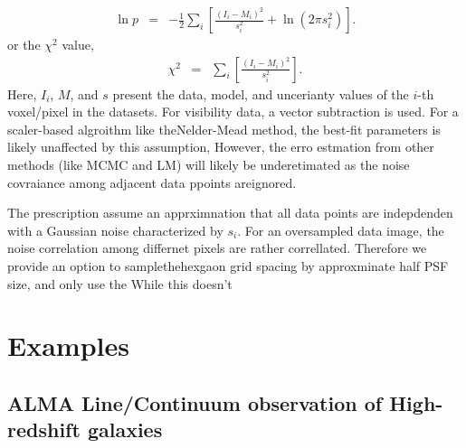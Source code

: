 \documentclass[twocolumn,tighten]{aastex62}
\begin{document}
\begin{eqnarray}
\label{eq:likelihood}
\ln p & = & -\frac{1}{2}\sum\limits_{i}\left[ \frac{(I_i-M_i)^2}{s_i^2} + \ln(2\pi s_i^2)   \right].
\end{eqnarray}
or the $\chi^2$ value,
\begin{eqnarray}
\label{eq:chisq}
\chi^2 & = & \sum\limits_{i}\left[ \frac{(I_i-M_i)^2}{s_i^2} \right].
\end{eqnarray}
Here, $I_i$, $M$, and $s$ present the data, model, and uncerianty values of the $i$-th voxel/pixel in the datasets.
For visibility data, a vector subtraction is used.
For a scaler-based algroithm like theNelder-Mead method, the best-fit parameters is likely unaffected by this assumption, 
However, the erro estmation from other methods (like MCMC and LM) will likely be underetimated as the noise covraiance among adjacent data ppoints areignored.

The prescription assume an apprximnation that all data points are indepdenden with a Gaussian noise characterized by $s_i$.
For an oversampled data image, the noise correlation among differnet pixels are rather correllated. Therefore we provide an option to samplethehexgaon grid spacing by approxminate half PSF size, and only use the 
While this doesn't 


%
%


\section{Examples}

\subsection{ALMA Line/Continuum observation of High-redshift galaxies}
\end{document}
